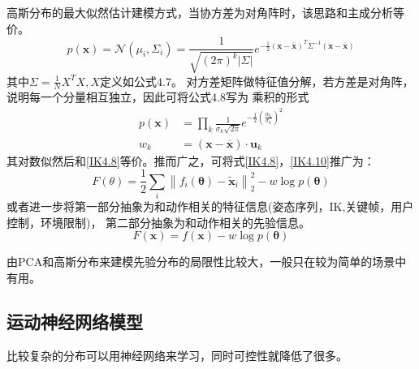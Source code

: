 \documentclass[lang=cn,newtx,10pt,scheme=chinese]{elegantbook}
\begin{document}
高斯分布的最大似然估计建模方式，当协方差为对角阵时，该思路和主成分析等价。
\begin{equation}
  p(\boldsymbol{x})=\mathcal{N}\left(\mu_i, \Sigma_i\right)=\frac{1}{\sqrt{(2 \pi)^k|\Sigma|}} e^{-\frac{1}{2}(\boldsymbol{x}-\overline{\boldsymbol{x}})^T \Sigma^{-1}(\boldsymbol{x}-\overline{\boldsymbol{x}})}
\end{equation}
其中$\Sigma = \frac{1}{N}X^T X,X \text{定义如公式4.7}$。
对方差矩阵做特征值分解，若方差是对角阵，说明每一个分量相互独立，因此可将公式4.8写为
乘积的形式
\begin{equation}
  \label{IK4.10}
  \begin{aligned}
  p(\boldsymbol{x}) & =\prod_k \frac{1}{\sigma_k \sqrt{2 \pi}} e^{-\frac{1}{2}\left(\frac{w_k}{\sigma_k}\right)^2} \\
  w_k & =(\boldsymbol{x}-\overline{\boldsymbol{x}}) \cdot \boldsymbol{u}_k
  \end{aligned}
\end{equation}
其对数似然后和\ref{IK4.8}等价。推而广之，可将式\ref{IK4.8}，\ref{IK4.10}推广为：
\begin{equation}
  F(\theta) =\frac{1}{2} \sum_i\left\|f_i(\boldsymbol{\theta})-
  \widetilde{\boldsymbol{x}}_i\right\|_2^2 
   -w\log p(\boldsymbol{\theta}) 
\end{equation}
或者进一步将第一部分抽象为和动作相关的特征信息(姿态序列，IK,关键帧，用户控制，环境限制)，
第二部分抽象为和动作相关的先验信息。
\begin{equation}
  F(\boldsymbol{x}) =f(\boldsymbol{x})-w\log p(\boldsymbol{\theta}) 
\end{equation}

由PCA和高斯分布来建模先验分布的局限性比较大，一般只在较为简单的场景中有用。

\subsection{运动神经网络模型}
比较复杂的分布可以用神经网络来学习，同时可控性就降低了很多。
\end{document}
